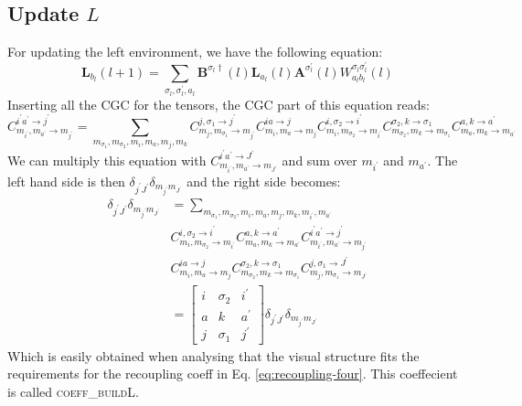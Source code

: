 \documentclass[a4paper,10pt,parskip=full]{scrartcl}
\begin{document}
\subsection{Update $L$}
For updating the left environment, we have the following equation:
\begin{equation}
  \pmb{L}_{b_l}(l+1) = \sum_{\sigma_{l},\sigma_{l}^\prime,a_l}\pmb{B}^{\sigma_{l}\dagger}(l)\pmb{L}_{a_{l}}(l)\pmb{A}^{\sigma_{l}^\prime}(l)W^{\sigma_{l}\sigma_{l}^\prime}_{a_{l}b_l}(l)
\end{equation}
Inserting all the CGC for the tensors, the CGC part of this equation reads:
\begin{equation}
  C^{i^\prime a^\prime\rightarrow j^\prime}_{m_{i^\prime},m_{a^\prime} \rightarrow m_{j^\prime}} =
  \sum_{m_{\sigma_1},m_{\sigma_2},m_i,m_a,m_j,m_k}
  C^{ j,\sigma_1\rightarrow j^\prime}_{ m_j,m_{\sigma_1}\rightarrow m_{j^\prime}}
  C^{i a\rightarrow j}_{m_{i},m_{a} \rightarrow m_{j}}
  C^{i,\sigma_2\rightarrow i^\prime}_{m_i,m_{\sigma_2}\rightarrow m_{i^\prime}}
  C^{\sigma_2,k\rightarrow\sigma_1}_{m_{\sigma_2},m_k\rightarrow m_{\sigma_1}}C^{a,k\rightarrow a^\prime}_{m_a,m_k\rightarrow m_{a^\prime}}
\end{equation}
We can multiply this equation with $C^{i^\prime a^\prime\rightarrow J^\prime}_{m_{i^\prime},m_{a^\prime} \rightarrow m_{J^\prime}}$
and sum over $m_{i^\prime}$ and $m_{a^\prime}$. The left hand side is then $\delta_{j^\prime J^\prime}\delta_{m_{j^\prime} m_{J^\prime}}$
and the right side becomes:
\begin{equation}
  \begin{split}
  \delta_{j^\prime J^\prime}\delta_{m_{j^\prime} m_{J^\prime}} &=
  \sum_{m_{\sigma_1},m_{\sigma_2},m_i,m_a,m_j,m_k,m_{i^\prime},m_{a^\prime}}\\
  &C^{i,\sigma_2\rightarrow i^\prime}_{m_i,m_{\sigma_2}\rightarrow m_{i^\prime}}
  C^{a,k\rightarrow a^\prime}_{m_a,m_k\rightarrow m_{a^\prime}}
  C^{i^\prime a^\prime\rightarrow j^\prime}_{m_{i^\prime},m_{a^\prime} \rightarrow m_{j^\prime}}\\
  &C^{i a\rightarrow j}_{m_{i},m_{a} \rightarrow m_{j}}
  C^{\sigma_2,k\rightarrow\sigma_1}_{m_{\sigma_2},m_k\rightarrow m_{\sigma_1}}
  C^{ j,\sigma_1\rightarrow J^\prime}_{ m_j,m_{\sigma_1}\rightarrow m_{J^\prime}}\\
  &=
  \begin{bmatrix}
    i & \sigma_2 & i^\prime \\
    a & k & a^\prime \\
    j & \sigma_1 &j^\prime
  \end{bmatrix}\delta_{j^\prime J^\prime}\delta_{m_{j^\prime} m_{J^\prime}}
  \end{split}
\end{equation}
Which is easily obtained when analysing that the visual structure fits the requirements for the recoupling coeff in Eq. \eqref{eq:recoupling-four}.
This coeffecient is called \textsc{coeff\_buildL}.
\end{document}
